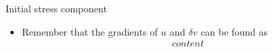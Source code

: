  
 	\begin{frame}{Initial stress component}
 		\begin{itemize}
 			\item Remember that the gradients of $u$ and $\delta v$ can be found as
 			\begin{equation}
 				\begin{aligned}
 				content
 				\end{aligned}
 			\end{equation}
 			
 		\end{itemize}
 	\end{frame}